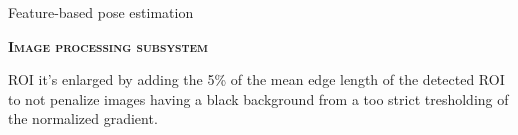 \documentclass[10pt]{beamer}
\begin{document}
\begin{frame}{Feature-based pose estimation}

  \bigskip

  \textsc{\textbf{\large Image processing subsystem}}

  \bigskip

ROI it's enlarged by adding the 5\% of the mean edge length of the detected ROI to not penalize images having a black background from a too strict tresholding of the normalized gradient.

  \smallskip

  \begin{figure}
    \captionsetup[subfigure]{labelformat=empty}
    \centering
    \qquad
    \qquad
  \end{figure}

  \bigskip
\end{frame}
\end{document}

